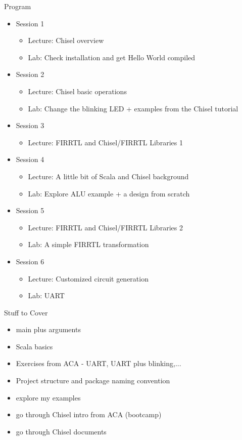 \begin{frame}[fragile]{Program}
\begin{itemize}
\item Session 1
\begin{itemize}
\item Lecture: Chisel overview
\item Lab: Check installation and get Hello World compiled
\end{itemize}
\item Session 2
\begin{itemize}
\item Lecture: Chisel basic operations
\item Lab: Change the blinking LED + examples from the Chisel tutorial
\end{itemize}
\item Session 3
\begin{itemize}
\item Lecture: FIRRTL and Chisel/FIRRTL Libraries 1
\end{itemize}
\item Session 4
\begin{itemize}
\item Lecture: A little bit of Scala and Chisel background 
\item Lab: Explore ALU example + a design from scratch
\end{itemize}
\item Session 5
\begin{itemize}
\item Lecture: FIRRTL and Chisel/FIRRTL Libraries 2
\item Lab: A simple FIRRTL transformation
\end{itemize}
\item Session 6
\begin{itemize}
\item Lecture: Customized circuit generation
\item Lab: UART
\end{itemize}
\end{itemize}
\end{frame}



\begin{frame}[fragile]{Stuff to Cover}
\begin{itemize}
\item main plus arguments
\item Scala basics
\item Exercises from ACA - UART, UART plus blinking,...
\item Project structure and package naming convention
\item explore my examples
\item go through Chisel intro from ACA (bootcamp)
\item go through Chisel documents
\end{itemize}
\end{frame}

